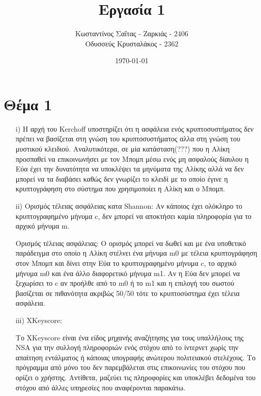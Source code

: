 \documentclass[a4paper, 11pt]{article}
\title{Εργασία 1}
\author{Κωσταντίνος Σαΐτας - Ζαρκιάς - 2406 \\ Οδυσσεύς Κρυσταλάκος - 2362}
\date{\today}
\newcommand{\lt}{\latintext}
\begin{document}
\maketitle

\section*{Θέμα 1}


\begin{itemize}
	\item[{\lt i)}] Η αρχή του {\lt Kerchoff} υποστηρίζει ότι η ασφάλεια ενός κρυπτοσυστήματος δεν πρέπει να βασίζεται στη γνώση του κρυπτοσυστήματος αλλα στη γνώση του μυστικού κλειδιού. Αναλυτικότερα, σε μία κατάσταση(???) που η Αλίκη προσπαθεί να επικοινωνήσει με τον Μπομπ μέσω ενός μη ασφαλούς δίαυλου η Εύα έχει την δυνατότητα να υποκλέψει τα μηνύματα της Αλίκης αλλά να δεν μπορεί να τα διαβάσει καθώς δεν γνωρίζει το κλειδί με το οποίο έγινε η κρυπτογράφηση στο σύστημα που χρησιμοποίει η Αλίκη και ο Μπομπ.







	\item[{\lt ii)}] Ορισμός τέλειας ασφάλειας κατα {\lt Shannon}: Αν κάποιος έχει ολόκληρο το κρυπτογραφημένο μήνυμα {\lt c}, δεν μπορεί να αποκτήσει καμία πληροφορία για το αρχικό μήνυμα {\lt m}.

					Ορισμός τέλειας ασφάλειας: Ο ορισμός μπορεί να δωθεί και με ένα υποθετικό παράδειγμα στο οποίο η Αλίκη στέλνει ένα μήνυμα {\lt m0} με τέλεια κρυπτογράφηση στον Μπομπ και δίνει στην Εύα το κρυπτογραφημένο μήνυμα {\lt c}, το αρχικό μήνυμα {\lt m0} και ένα άλλο διαφορετικό μήνυμα {\lt m1}. Αν η Εύα δεν μπορεί να ξεχωρίσει το {\lt c} αν προήλθε από το {\lt m0} ή το {\lt m1} και η επιλογή του σωστού βασίζεται σε πιθανότητα ακριβώς 50/50 τότε το κρυπτοσύστημα έχει τέλεια ασφάλεια.







	\item[{\lt iii)}] {\lt XKeyscore}:

	Το {\lt XKeyscore} είναι ένα είδος μηχανής αναζήτησης για τους υπαλλήλους της {\lt NSA} για την συλλογή πληροφοριών ενός στόχου από το ίντερνετ χωρίς την απαίτηση εντάλματος ή κάποιας υπογραφής ανώτερου πολιτειακού στελέχους. Το πρόγραμμα από μόνο του δεν παρεμβάλεται στις επικοινωνίες του στόχου που ορίζει ο χρήστης. Αντίθετα, μαζεύει τις πληροφορίες και υποκλέβει δεδομένα του στόχου από άλλες υπηρεσίες που αναφέρονται παρακάτω.



\end{itemize}
\end{document}
